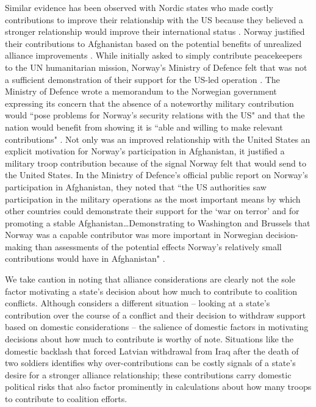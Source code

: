 \documentclass[12pt,letterpaper]{article}
\begin{document}
		Similar evidence has been observed with Nordic states who made costly contributions to improve their relationship with the US because they believed a stronger relationship would improve their international status \citep{pedersen_bandwagonstatuschanging_2018}. Norway justified their contributions to Afghanistan based on the potential benefits of unrealized alliance improvements \citep{oma_smallstatesburdensharing_2014}. While initially asked to simply contribute peacekeepers to the UN humanitarian mission, Norway's Ministry of Defence felt that was not a sufficient demonstration of their support for the US-led operation \citep{ministryofdefenceiisecuritypolicy_mulignorskubatstotte_2001}. The Ministry of Defence wrote a memorandum to the Norwegian government expressing its concern that the absence of a noteworthy military contribution would ``pose problems for Norway's security relations with the US" and that the nation would benefit from showing it is ``able and willing to make relevant contributions" \citep{ministryofdefenceiisecuritypolicy_muligenorskemilitaere_2001}. Not only was an improved relationship with the United States an explicit motivation for Norway's participation in Afghanistan, it justified a military troop contribution because of the signal Norway felt that would send to the United States. In the Ministry of Defence's official public report on Norway's participation in Afghanistan, they noted that ``the US authorities saw participation in the military operations as the most important means by which other countries could demonstrate their support for the `war on terror' and for promoting a stable Afghanistan\ldots Demonstrating to Washington and Brussels that Norway was a capable contributor was more important in Norwegian decision-making than assessments of the potential effects Norway's relatively small contributions would have in Afghanistan" \citep[214-216]{godal_goodallynorway_2016}.
		
		We take caution in noting that alliance considerations are clearly not the sole factor motivating a state's decision about how much to contribute to coalition conflicts. Although \citet{mello_pathscoalitiondefection_2020} considers a different situation -- looking at a state's contribution over the course of a conflict and their decision to withdraw support based on domestic considerations -- the salience of domestic factors in motivating decisions about how much to contribute is worthy of note. Situations like the domestic backlash that forced Latvian withdrawal from Iraq after the death of two soldiers identifies why over-contributions can be costly signals of a state's desire for a stronger alliance relationship; these contributions carry domestic political risks that also factor prominently in calculations about how many troops to contribute to coalition efforts.
\end{document}
